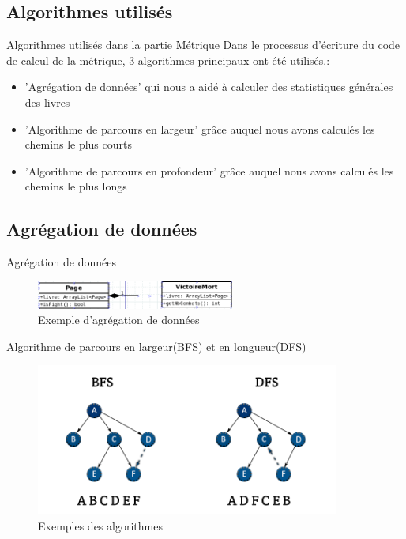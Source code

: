 \documentclass[aspectratio=169,xcolor=dvipsnames]{beamer}
\begin{document}
\subsection{Algorithmes utilisés}
\begin{frame}{Algorithmes utilisés dans la partie Métrique}
Dans le processus d'écriture du code de calcul de la métrique, 3 algorithmes principaux ont été utilisés.:
\begin{itemize}
\item 'Agrégation de données'
qui nous a aidé à calculer des statistiques générales des livres
\item 'Algorithme de parcours en largeur' grâce auquel nous avons calculés les chemins le plus courts
\item 'Algorithme de parcours en profondeur' grâce auquel nous avons calculés les chemins le plus longs
\end{itemize}
\end{frame}

\subsection{Agrégation de données}
\begin{frame}{Agrégation de données}
\begin{figure}
\centering
  \includegraphics[width=65mm,scale=0.5]{agregation.png}
  \caption{Exemple d'agrégation de données}
  \label{fig:boat1}
\end{figure}
\end{frame}

\begin{frame}{Algorithme de parcours en largeur(BFS) et en longueur(DFS)}
\begin{figure}
\centering
  \includegraphics[width=100mm,scale=0.5]{BFS-DFS.png}
  \caption{Exemples des algorithmes}
\end{figure}

\end{frame}
\end{document}
